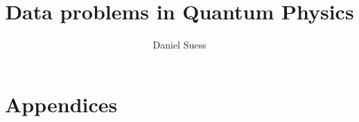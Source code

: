 \documentclass[a4paper,11pt,BCOR=8mm,twoside,headsepline]{scrbook}
\author{Daniel Suess}
\title{Data problems in Quantum Physics}
\begin{document}
\frontmatter
\maketitle
\tableofcontents
\newpage
\makeatletter
\providecommand\@dotsep{5}
\makeatother
\listoftodos\relax
\newpage



\mainmatter






\appendix
\chapter{Appendices}


\printbibliography
\end{document}
